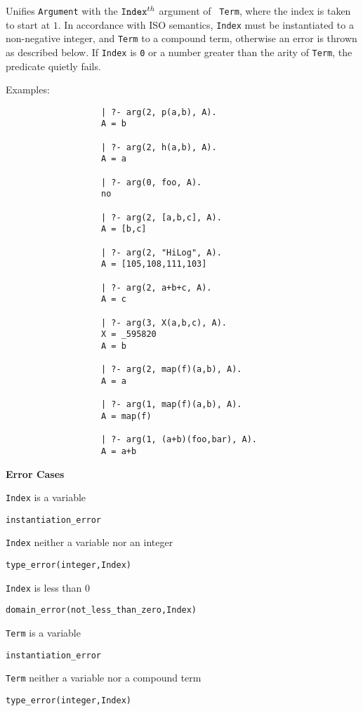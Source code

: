 \begin{description}
%
  Unifies {\tt Argument} with the ${\tt Index}^{th}$ argument of {\tt
    Term}\@, where the index is taken to start at $1$.  In accordance
  with ISO semantics, {\tt Index} must be instantiated to a
  non-negative integer, and {\tt Term} to a compound term, otherwise
  an error is thrown as described below.  If {\tt Index} is {\tt 0} or
  a number greater than the arity of {\tt Term}, the predicate quietly
  fails.

    Examples:
    {\footnotesize
     \begin{verbatim}
                   | ?- arg(2, p(a,b), A).
                   A = b

                   | ?- arg(2, h(a,b), A).
                   A = a

                   | ?- arg(0, foo, A).
                   no

                   | ?- arg(2, [a,b,c], A).
                   A = [b,c]

                   | ?- arg(2, "HiLog", A).
                   A = [105,108,111,103]

                   | ?- arg(2, a+b+c, A).
                   A = c

                   | ?- arg(3, X(a,b,c), A).
                   X = _595820 
                   A = b 

                   | ?- arg(2, map(f)(a,b), A).
                   A = a

                   | ?- arg(1, map(f)(a,b), A). 
                   A = map(f)

                   | ?- arg(1, (a+b)(foo,bar), A).
                   A = a+b
     \end{verbatim}}

{\bf Error Cases} 
\bi
\item 	{\tt Index} is a variable
\bi
\item    {\tt instantiation\_error}
\ei
\item 	{\tt Index} neither a variable nor an integer
\bi
\item    {\tt type\_error(integer,Index)}
\ei
\item 	{\tt Index} is less than 0
\bi
\item    {\tt domain\_error(not\_less\_than\_zero,Index)}
\ei
\item 	{\tt Term} is a variable
\bi
\item    {\tt instantiation\_error}
\ei
\item 	{\tt Term} neither a variable nor a compound term
\bi
\item    {\tt type\_error(integer,Index)}
\ei
\ei


\end{description}
